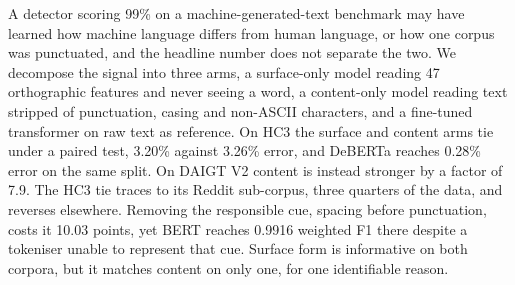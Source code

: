 A detector scoring 99\% on a machine-generated-text benchmark may have learned how machine language differs from human language, or how one corpus was punctuated, and the headline number does not separate the two. We decompose the signal into three arms, a surface-only model reading 47 orthographic features and never seeing a word, a content-only model reading text stripped of punctuation, casing and non-ASCII characters, and a fine-tuned transformer on raw text as reference. On HC3 the surface and content arms tie under a paired test, 3.20\% against 3.26\% error, and DeBERTa reaches 0.28\% error on the same split. On DAIGT V2 content is instead stronger by a factor of 7.9. The HC3 tie traces to its Reddit sub-corpus, three quarters of the data, and reverses elsewhere. Removing the responsible cue, spacing before punctuation, costs it 10.03 points, yet BERT reaches 0.9916 weighted F1 there despite a tokeniser unable to represent that cue. Surface form is informative on both corpora, but it matches content on only one, for one identifiable reason.
